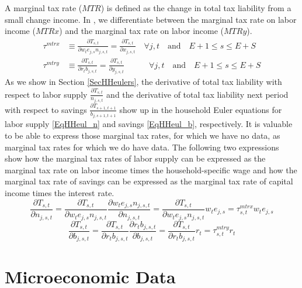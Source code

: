   A marginal tax rate ($MTR$) is defined as the change in total tax liability from a small change income. In \ogindia, we differentiate between the marginal tax rate on labor income ($MTRx$) and the marginal tax rate on labor income ($MTRy$).
  \begin{align}
    \tau^{mtrx} &\equiv \frac{\partial T_{s,t}}{\partial w_t e_{j,s}n_{j,s,t}} = \frac{\partial T_{s,t}}{\partial x_{j,s,t}} \quad\forall j,t \quad\text{and}\quad E+1\leq s\leq E+S \label{EqTaxCalcMTRx} \\
    \tau^{mtry} &\equiv \frac{\partial T_{s,t}}{\partial r_t b_{j,s,t}} = \frac{\partial T_{s,t}}{\partial y_{j,s,t}} \qquad\quad\forall j,t \quad\text{and}\quad E+1\leq s\leq E+S \label{EqTaxCalcMTRy}
  \end{align}
  As we show in Section \ref{SecHHeulers}, the derivative of total tax liability with respect to labor supply $\frac{\partial T_{s,t}}{n_{j,s,t}}$ and the derivative of total tax liability next period with respect to savings $\frac{\partial T_{s+1,t+1}}{b_{j,s+1,t+1}}$ show up in the household Euler equations for labor supply \eqref{EqHHeul_n} and savings \eqref{EqHHeul_b}, respectively. It is valuable to be able to express those marginal tax rates, for which we have no data, as marginal tax rates for which we do have data. The following two expressions show how the marginal tax rates of labor supply can be expressed as the marginal tax rate on labor income times the household-specific wage and how the marginal tax rate of savings can be expressed as the marginal tax rate of capital income times the interest rate.
  \begin{equation}\label{EqMTRx_derive}
    \frac{\partial T_{s,t}}{\partial n_{j,s,t}}  = \frac{\partial T_{s,t}}{\partial w_t e_{j,s}n_{j,s,t}}\frac{\partial w_{t}e_{j,s}n_{j,s,t}}{\partial n_{j,s,t}} = \frac{\partial T_{s,t}}{\partial w_{t}e_{j,s}n_{j,s,t}}w_t e_{j,s} = \tau^{mtrx}_{s,t}w_t e_{j,s}
  \end{equation}
  \begin{equation}\label{EqMTRy_derive}
    \frac{\partial T_{s,t}}{\partial b_{j,s,t}} = \frac{\partial T_{s,t}}{\partial r_{t}b_{j,s,t}}\frac{\partial r_t b_{j,s,t}}{\partial b_{j,s,t}} = \frac{\partial T_{s,t}}{\partial r_t b_{j,s,t}}r_{t} = \tau^{mtry}_{s,t}r_t
  \end{equation}


\section{Microeconomic Data}\label{SecTaxCalcMicro}

